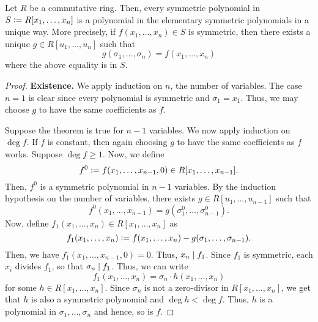 \begin{theorem} \label{thm:ftsp}
    Let $R$ be a commutative ring. Then, every symmetric polynomial in $S \vcentcolon= R[x_1, \ldots, x_n]$ is a polynomial in the elementary symmetric polynomials in a unique way. More precisely, if $f(x_1, \ldots, x_n) \in S$ is symmetric, then there exists a unique $g \in R[u_1, \ldots, u_n]$ such that 
    \[
        g(\sigma_1, \ldots, \sigma_n) = f(x_1, \ldots, x_n)
    \]
    where the above equality is in $S$.
\end{theorem}
\begin{proof}
    \textbf{Existence.} We apply induction on $n$, the number of variables. The case $n=1$ is clear since every polynomial is symmetric and $\sigma_1 = x_1$. Thus, we may choose $g$ to have the same coefficients as $f$.
    
    Suppose the theorem is true for $n-1$ variables. We now apply induction on $\deg f$. If $f$ is constant, then again choosing $g$ to have the same coefficients as $f$ works. Suppose $\deg f \geq 1$. Now, we define
    \[
        f^0 \vcentcolon= f(x_1, \ldots, x_{n-1}, 0) \in R[x_1, \ldots, x_{n-1}].
    \]
    Then, $f^0$ is a symmetric polynomial in $n-1$ variables. By the induction hypothesis on the number of variables, there exists $g \in R[u_1, \ldots, u_{n-1}]$ such that
    \[
        f^0(x_1, \ldots, x_{n-1}) = g(\sigma^0_1, \ldots, \sigma^0_{n-1}).
    \]
    Now, define $f_1(x_1, \ldots, x_n) \in R[x_1, \ldots, x_n]$ as
    \[
        f_1(x_1, \ldots, x_n) \vcentcolon= f(x_1, \ldots, x_n) - g(\sigma_1, \ldots, \sigma_{n-1}).
    \]
    Then, we have $f_1(x_1, \ldots, x_{n-1}, 0) = 0$. Thus, $x_n \mid f_1$. Since $f_1$ is symmetric, each $x_i$ divides $f_1$, so that $\sigma_n \mid f_1$. Thus, we can write
    \[
        f_1(x_1, \ldots, x_n) = \sigma_n \cdot h(x_1, \ldots, x_n)
    \]
    for some $h \in R[x_1, \ldots, x_n]$. Since $\sigma_n$ is not a zero-divisor in $R[x_1, \ldots, x_n]$, we get that $h$ is also a symmetric polynomial and $\deg h < \deg f$. Thus, $h$ is a polynomial in $\sigma_1, \ldots, \sigma_n$ and hence, so is $f$.
    

\end{proof}
